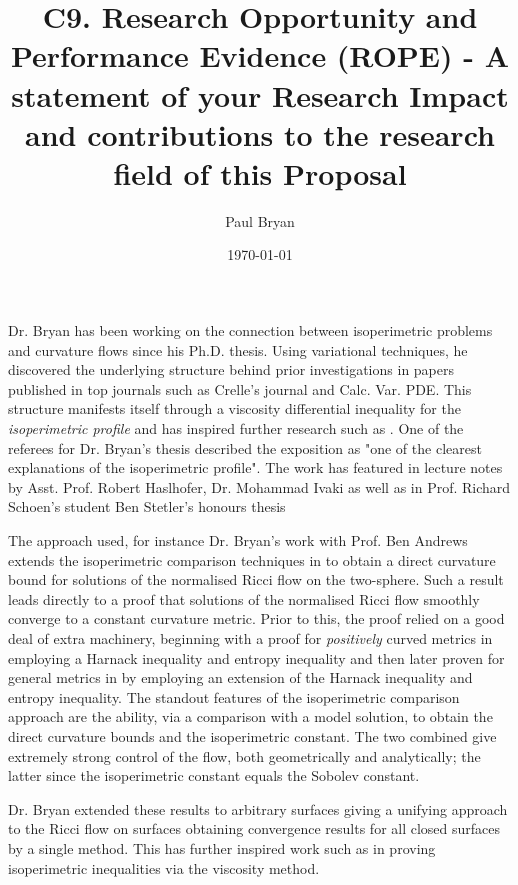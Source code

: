 \documentclass[12pt]{amsart}
\date{}
\author{Paul Bryan}
\date{\today}
\title{C9. Research Opportunity and Performance Evidence (ROPE) - A statement of your Research Impact and contributions to the research field of this Proposal}
\begin{document}
Dr. Bryan has been working on the connection between isoperimetric problems and curvature flows since his Ph.D. thesis. Using variational techniques, he discovered the underlying structure behind prior investigations \cite{MR1369140,MR1369139,MR1656553,Bryan} in papers published in top journals such as Crelle's journal and Calc. Var. PDE. This structure manifests itself through a viscosity differential inequality for the \emph{isoperimetric profile} and has inspired further research such as \cite{MR3544942, MR3570462}. One of the referees for Dr. Bryan's thesis described the exposition as "one of the clearest explanations of the isoperimetric profile". The work has featured in lecture notes by Asst. Prof. Robert Haslhofer, Dr. Mohammad Ivaki as well as in Prof. Richard Schoen's student Ben Stetler's honours thesis

The approach used, for instance Dr. Bryan's work with Prof. Ben Andrews \cite{MR2729306} extends the isoperimetric comparison techniques in \cite{MR1369140,MR1369139} to obtain a direct curvature bound for solutions of the normalised Ricci flow on the two-sphere. Such a result leads directly to a proof that solutions of the normalised Ricci flow smoothly converge to a constant curvature metric. Prior to this, the proof relied on a good deal of extra machinery, beginning with a proof for \emph{positively} curved metrics in \cite{MR954419} employing a Harnack inequality and entropy inequality and then later proven for general metrics in \cite{MR1094458} by employing an extension of the Harnack inequality and entropy inequality. The standout features of the isoperimetric comparison approach are the ability, via a comparison with a model solution, to obtain the direct curvature bounds and the isoperimetric constant. The two combined give extremely strong control of the flow, both geometrically and analytically; the latter since the isoperimetric constant equals the Sobolev constant.

Dr. Bryan extended these results to arbitrary surfaces \cite{Bryan} giving a unifying approach to the Ricci flow on surfaces obtaining convergence results for all closed surfaces by a single method. This has further inspired work such as \cite{2014arXiv1411.2672N} in proving isoperimetric inequalities via the viscosity method.
\end{document}
